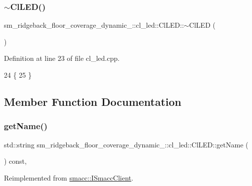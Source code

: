 \subsubsection{\texorpdfstring{$\sim$\+Cl\+L\+E\+D()}{~ClLED()}}
{\footnotesize\ttfamily sm\+\_\+ridgeback\+\_\+floor\+\_\+coverage\+\_\+dynamic\+\_\+::cl\+\_\+led\+::\+Cl\+L\+E\+D\+::$\sim$\+Cl\+L\+ED (\begin{DoxyParamCaption}{ }\end{DoxyParamCaption})\hspace{0.3cm}{\ttfamily [virtual]}}



Definition at line 23 of file cl\+\_\+led.\+cpp.


\begin{DoxyCode}
24 \{
25 \}
\end{DoxyCode}


\subsection{Member Function Documentation}
\mbox{\label{classsm__ridgeback__floor__coverage__dynamic__1_1_1cl__led_1_1ClLED_a0f000a65ef7ec3bb3255776434e95e63}} 
\subsubsection{\texorpdfstring{get\+Name()}{getName()}}
{\footnotesize\ttfamily std\+::string sm\+\_\+ridgeback\+\_\+floor\+\_\+coverage\+\_\+dynamic\+\_\+::cl\+\_\+led\+::\+Cl\+L\+E\+D\+::get\+Name (\begin{DoxyParamCaption}{ }\end{DoxyParamCaption}) const\hspace{0.3cm}{\ttfamily [override]}, {\ttfamily [virtual]}}



Reimplemented from \hyperlink{classsmacc_1_1ISmaccClient_a8c3ce19f182e71909c5dc6263d25be69}{smacc\+::\+I\+Smacc\+Client}.



